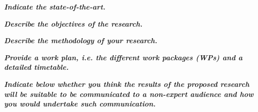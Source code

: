 \documentclass[11pt,a4paper]{article}
\begin{document}
\begin{center}
\textbf{\textit{{\Large Indicate the state-of-the-art.}}}\\
\end{center}



\begin{center}
\textbf{\textit{{\Large Describe the objectives of the research.}}}\\
\end{center}


\begin{center}
\textbf{\textit{{\Large Describe the methodology of your research.}}}\\
\end{center}


\begin{center}
\textbf{\textit{{\Large Provide a work plan, i.e. the different work packages (WPs) and a detailed timetable.}}}\\
\end{center}


\newpage
\begin{center}
\textbf{\textit{{\Large Indicate below whether you think the results of the proposed research will be suitable to be communicated to a non-expert audience and how you would undertake such communication.}}}\\
\end{center}


%



\newpage


%
\end{document}
